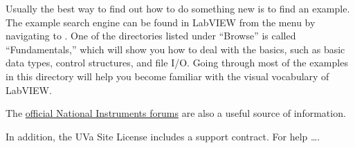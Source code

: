 Usually the best way to find out how to do something new is to find an example.  The example search engine can be found in LabVIEW from the menu by navigating to .  One of the directories listed under ``Browse'' is called ``Fundamentals,'' which will show you how to deal with the basics, such as basic data types, control structures, and file I/O.  Going through most of the examples in this directory will help you become familiar with the visual vocabulary of LabVIEW.

The \href{http://forums.ni.com/ni/}{official National Instruments forums} are also a useful source of information.

In addition, the UVa Site License includes a support contract.  For help \ldots \FIXME.


